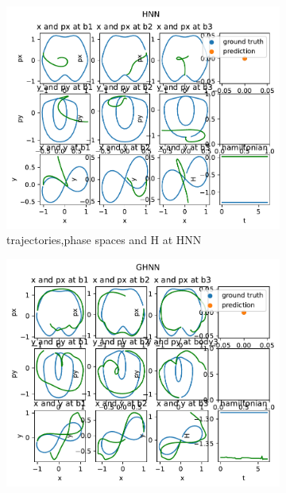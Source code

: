 \begin{figure}[H]
	\centering
	\begin{subfigure}[b]{0.3\textwidth}
		\centering
		\includegraphics[width=\textwidth]{chapters/chapter5/fignew_hnn_traj.pdf}
		\caption{trajectories,phase spaces and H at HNN}
	\end{subfigure}
	\hfill
	\begin{subfigure}[b]{0.3\textwidth}
		\centering
		\includegraphics[width=\textwidth]{chapters/chapter5/fignew_ghnn_traj.pdf}

\end{subfigure}
\end{figure}
